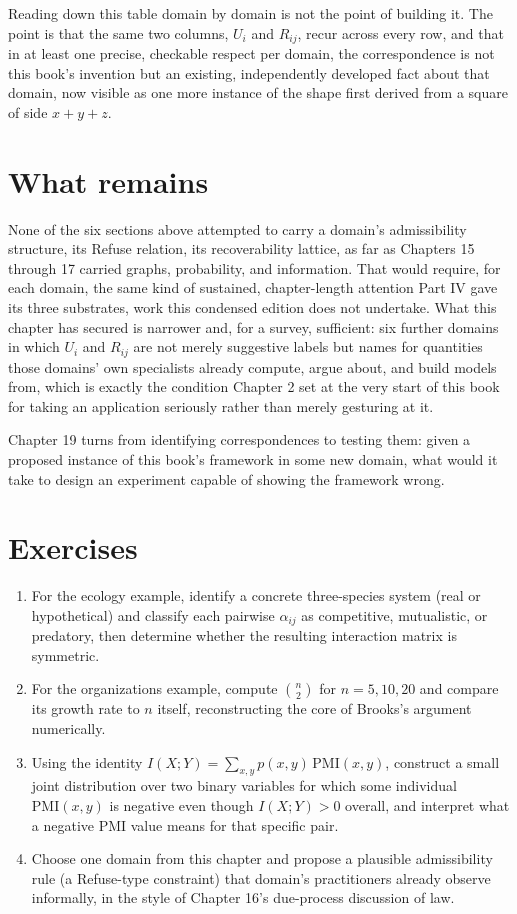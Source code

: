 \documentclass[11pt]{book}
\begin{document}
Reading down this table domain by domain is not the point of building it. The point is that the same two columns, $U_i$ and $R_{ij}$, recur across every row, and that in at least one precise, checkable respect per domain, the correspondence is not this book's invention but an existing, independently developed fact about that domain, now visible as one more instance of the shape first derived from a square of side $x+y+z$.

\section{What remains}

None of the six sections above attempted to carry a domain's admissibility structure, its Refuse relation, its recoverability lattice, as far as Chapters 15 through 17 carried graphs, probability, and information. That would require, for each domain, the same kind of sustained, chapter-length attention Part IV gave its three substrates, work this condensed edition does not undertake. What this chapter has secured is narrower and, for a survey, sufficient: six further domains in which $U_i$ and $R_{ij}$ are not merely suggestive labels but names for quantities those domains' own specialists already compute, argue about, and build models from, which is exactly the condition Chapter 2 set at the very start of this book for taking an application seriously rather than merely gesturing at it.

Chapter 19 turns from identifying correspondences to testing them: given a proposed instance of this book's framework in some new domain, what would it take to design an experiment capable of showing the framework wrong.

\section*{Exercises}
\begin{enumerate}
\item For the ecology example, identify a concrete three-species system (real or hypothetical) and classify each pairwise $\alpha_{ij}$ as competitive, mutualistic, or predatory, then determine whether the resulting interaction matrix is symmetric.
\item For the organizations example, compute $\binom{n}{2}$ for $n=5,10,20$ and compare its growth rate to $n$ itself, reconstructing the core of Brooks's argument numerically.
\item Using the identity $I(X;Y)=\sum_{x,y}p(x,y)\,\mathrm{PMI}(x,y)$, construct a small joint distribution over two binary variables for which some individual $\mathrm{PMI}(x,y)$ is negative even though $I(X;Y)>0$ overall, and interpret what a negative PMI value means for that specific pair.
\item Choose one domain from this chapter and propose a plausible admissibility rule (a Refuse-type constraint) that domain's practitioners already observe informally, in the style of Chapter 16's due-process discussion of law.
\end{enumerate}
\end{document}
